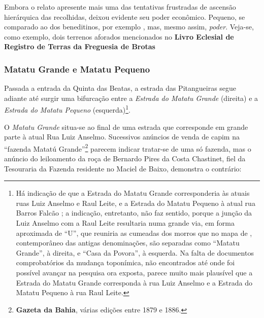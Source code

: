 Embora o relato apresente mais uma das tentativas frustradas de ascensão hierárquica das recolhidas, deixou evidente seu poder econômico. Pequeno, se comparado ao dos beneditinos, por exemplo \cite{bento_tombo_1945}, mas, mesmo assim, \textit{poder}. Veja-se, como exemplo, dois terrenos aforados mencionados no \textbf{Livro Eclesial de Registro de Terras da Freguesia de Brotas}

\begin{citacao}

\end{citacao}

\subsubsection{Matatu Grande e Matatu Pequeno}

Passada a entrada da Quinta das Beatas, a estrada das Pitangueiras segue adiante até surgir uma bifurcação entre a \textit{Estrada do Matatu Grande} (direita) e a \textit{Estrada do Matatu Pequeno} (esquerda)\footnote{Há indicação de que a Estrada do Matatu Grande corresponderia às atuais ruas Luiz Anselmo e Raul Leite, e a Estrada do Matatu Pequeno à atual rua Barros Falcão \cite[p.~124]{valladares_beaba_2012}; a indicação, entretanto, não faz sentido, porque a junção da Luiz Anselmo com a Raul Leite resultaria numa grande via, em forma aproximada de ``U'', que reuniria as cumeadas dos morros que no mapa de , contemporâneo das antigas denominações, são separadas como ``Matatu Grande'', à direita, e ``Casa da Povora'', à esquerda. Na falta de documentos comprobatórios da mudança toponímica, não encontrados até onde foi possível avançar na pesquisa ora exposta, parece muito mais plausível que a Estrada do Matatu Grande corresponda à rua Luiz Anselmo e a Estrada do Matatu Pequeno à rua Raul Leite.}.

O \textit{Matatu Grande} situa-se ao final de uma estrada que corresponde em grande parte à atual Rua Luiz Anselmo. Sucessivos anúncios de venda de capim na ``fazenda Matatú Grande''\footnote{\textbf{Gazeta da Bahia}, várias edições entre 1879 e 1886.} parecem indicar tratar-se de uma só fazenda, mas o anúncio do leiloamento da roça de Bernardo Pires da Costa Chastinet, fiel da Tesouraria da Fazenda residente no Maciel de Baixo, demonstra o contrário:

